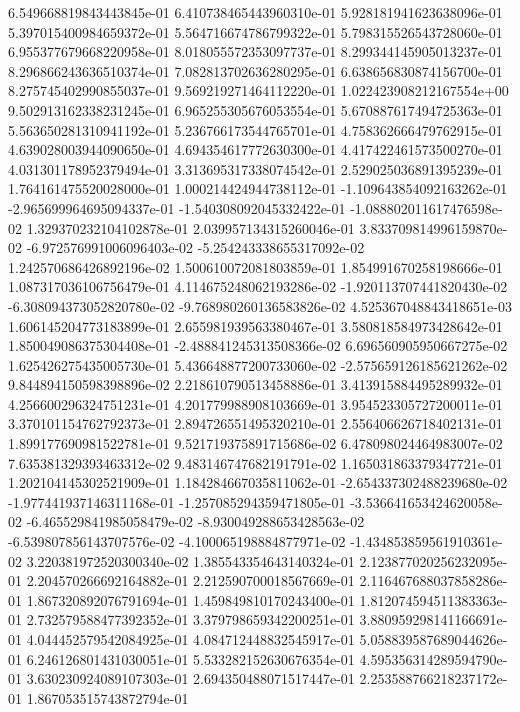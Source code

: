 6.549668819843443845e-01
6.410738465443960310e-01
5.928181941623638096e-01
5.397015400984659372e-01
5.564716674786799322e-01
5.798315526543728060e-01
6.955377679668220958e-01
8.018055572353097737e-01
8.299344145905013237e-01
8.296866243636510374e-01
7.082813702636280295e-01
6.638656830874156700e-01
8.275745402990855037e-01
9.569219271464112220e-01
1.022423908212167554e+00
9.502913162338231245e-01
6.965255305676053554e-01
5.670887617494725363e-01
5.563650281310941192e-01
5.236766173544765701e-01
4.758362666479762915e-01
4.639028003944090650e-01
4.694354617772630300e-01
4.417422461573500270e-01
4.031301178952379494e-01
3.313695317338074542e-01
2.529025036891395239e-01
1.764161475520028000e-01
1.000214424944738112e-01
-1.109643854092163262e-01
-2.965699964695094337e-01
-1.540308092045332422e-01
-1.088802011617476598e-02
1.329370232104102878e-01
2.039957134315260046e-01
3.833709814996159870e-02
-6.972576991006096403e-02
-5.254243338655317092e-02
1.242570686426892196e-02
1.500610072081803859e-01
1.854991670258198666e-01
1.087317036106756479e-01
4.114675248062193286e-02
-1.920113707441820430e-02
-6.308094373052820780e-02
-9.768980260136583826e-02
4.525367048843418651e-03
1.606145204773183899e-01
2.655981939563380467e-01
3.580818584973428642e-01
1.850049086375304408e-01
-2.488841245313508366e-02
6.696560905950667275e-02
1.625426275435005730e-01
5.436648877200733060e-02
-2.575659126185621262e-02
9.844894150598398896e-02
2.218610790513458886e-01
3.413915884495289932e-01
4.256600296324751231e-01
4.201779988908103669e-01
3.954523305727200011e-01
3.370101154762792373e-01
2.894726551495320210e-01
2.556406626718402131e-01
1.899177690981522781e-01
9.521719375891715686e-02
6.478098024464983007e-02
7.635381329393463312e-02
9.483146747682191791e-02
1.165031863379347721e-01
1.202104145302521909e-01
1.184284667035811062e-01
-2.654337302488239680e-02
-1.977441937146311168e-01
-1.257085294359471805e-01
-3.536641653424620058e-02
-6.465529841985058479e-02
-8.930049288653428563e-02
-6.539807856143707576e-02
-4.100065198884877971e-02
-1.434853859561910361e-02
3.220381972520300340e-02
1.385543354643140324e-01
2.123877020256232095e-01
2.204570266692164882e-01
2.212590700018567669e-01
2.116467688037858286e-01
1.867320892076791694e-01
1.459849810170243400e-01
1.812074594511383363e-01
2.732579588477392352e-01
3.379798659342200251e-01
3.880959298141166691e-01
4.044452579542084925e-01
4.084712448832545917e-01
5.058839587689044626e-01
6.246126801431030051e-01
5.533282152630676354e-01
4.595356314289594790e-01
3.630230924089107303e-01
2.694350488071517447e-01
2.253588766218237172e-01
1.867053515743872794e-01
